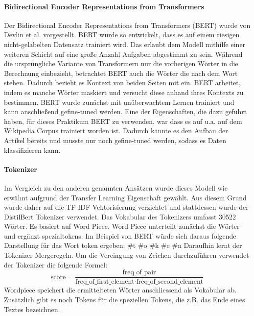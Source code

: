 \paragraph{Bidirectional Encoder Representations from Transformers}
Der Bidirectional Encoder Representations from Transformers (BERT) wurde von Devlin et al.  \cite{Devlin2018} vorgestellt. BERT wurde so entwickelt, dass es auf einem riesigen nicht-gelabelten Datensatz trainiert wird. Das erlaubt dem Modell mithilfe einer weiteren Schicht auf eine große Anzahl Aufgaben abgestimmt zu sein. Während die ursprüngliche Variante von Transformern nur die vorherigen Wörter in die Berechnung einbezieht, betrachtet BERT auch die Wörter die nach dem Wort stehen. Dadurch bezieht es Kontext von beiden Seiten mit ein. BERT arbeitet, indem es manche Wörter maskiert und versucht diese anhand ihres Kontexts zu bestimmen. BERT wurde zunächst mit unüberwachtem Lernen trainiert und kann anschließend gefine-tuned werden. Eine der Eigenschaften, die dazu geführt haben, für dieses Praktikum BERT zu verwenden, war dass es auf u.a. auf dem Wikipedia Corpus trainiert worden ist. Dadurch kannte es den Aufbau der Artikel bereits und musste nur noch gefine-tuned werden, sodass es Daten klassifizieren kann.

\paragraph{Tokenizer}
Im Vergleich zu den anderen genannten Ansätzen wurde dieses Modell wie erwähnt aufgrund der Transfer Learning Eigenschaft gewählt. Aus diesem Grund wurde daher auf die TF-IDF Vektorisierung verzichtet und stattdessen wurde der DistilBert Tokenizer verwendet. Das Vokabular des Tokenizers umfasst 30522 Wörter. Es basiert auf Word Piece. Word Piece unterteilt zunächst die Wörter und ergänzt spezialtokens. Im Beispiel von BERT würde sich daraus folgende Darstellung für das Wort token ergeben: \#t \#o \#k \#e \#n
Daraufhin lernt der Tokenizer Mergeregeln. Um die Vereingung von Zeichen durchzuführen verwendet der Tokenizer die folgende Formel:
$$
    \text{score} = \frac{\text{freq\_of\_pair}}{\text{freq\_of\_first\_element} \cdot \text{freq\_of\_second\_element}}
$$
Wordpiece speichert die ermittelteten Wörter anschliessend als Vokabular ab. Zusätzlich gibt es noch Tokens für die speziellen Tokens, die z.B. das Ende eines Textes bezeichnen.

